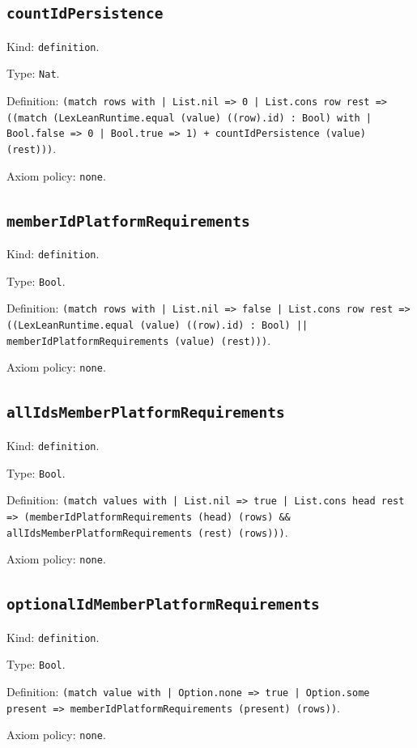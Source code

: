 \documentclass[11pt]{article}
\begin{document}
\subsection*{\texttt{countIdPersistence}}
\noindent Kind: \texttt{definition}.\par
\noindent Type: \texttt{Nat}.\par
\noindent Definition: \texttt{(match rows with | List.nil => 0 | List.cons row rest => ((match (LexLeanRuntime.equal (value) ((row).id) : Bool) with | Bool.false => 0 | Bool.true => 1) + countIdPersistence (value) (rest)))}.\par
\noindent Axiom policy: \texttt{none}.\par
\subsection*{\texttt{memberIdPlatformRequirements}}
\noindent Kind: \texttt{definition}.\par
\noindent Type: \texttt{Bool}.\par
\noindent Definition: \texttt{(match rows with | List.nil => false | List.cons row rest => ((LexLeanRuntime.equal (value) ((row).id) : Bool) || memberIdPlatformRequirements (value) (rest)))}.\par
\noindent Axiom policy: \texttt{none}.\par
\subsection*{\texttt{allIdsMemberPlatformRequirements}}
\noindent Kind: \texttt{definition}.\par
\noindent Type: \texttt{Bool}.\par
\noindent Definition: \texttt{(match values with | List.nil => true | List.cons head rest => (memberIdPlatformRequirements (head) (rows) \&\& allIdsMemberPlatformRequirements (rest) (rows)))}.\par
\noindent Axiom policy: \texttt{none}.\par
\subsection*{\texttt{optionalIdMemberPlatformRequirements}}
\noindent Kind: \texttt{definition}.\par
\noindent Type: \texttt{Bool}.\par
\noindent Definition: \texttt{(match value with | Option.none => true | Option.some present => memberIdPlatformRequirements (present) (rows))}.\par
\noindent Axiom policy: \texttt{none}.\par
\end{document}
